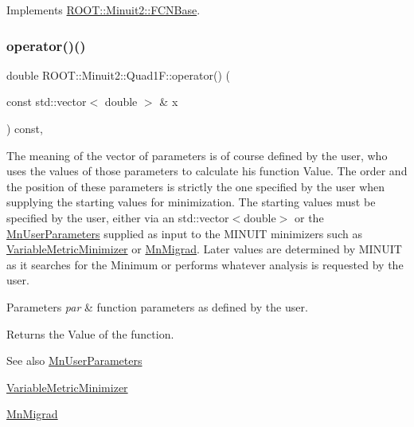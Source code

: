 Implements \mbox{\hyperlink{classROOT_1_1Minuit2_1_1FCNBase_ae4a86bd94d0d0f5ca6fc8f8ab2bb43cd}{R\+O\+O\+T\+::\+Minuit2\+::\+F\+C\+N\+Base}}.

\mbox{\label{classROOT_1_1Minuit2_1_1Quad1F_a879588547439114ea9ad1e749f1300c5}} 
\subsubsection{\texorpdfstring{operator()()}{operator()()}\hspace{0.1cm}{\footnotesize\ttfamily [2/2]}}
{\footnotesize\ttfamily double R\+O\+O\+T\+::\+Minuit2\+::\+Quad1\+F\+::operator() (\begin{DoxyParamCaption}\item[{const std\+::vector$<$ double $>$ \&}]{x }\end{DoxyParamCaption}) const\hspace{0.3cm}{\ttfamily [inline]}, {\ttfamily [virtual]}}

The meaning of the vector of parameters is of course defined by the user, who uses the values of those parameters to calculate his function Value. The order and the position of these parameters is strictly the one specified by the user when supplying the starting values for minimization. The starting values must be specified by the user, either via an std\+::vector$<$double$>$ or the \mbox{\hyperlink{classROOT_1_1Minuit2_1_1MnUserParameters}{Mn\+User\+Parameters}} supplied as input to the M\+I\+N\+U\+IT minimizers such as \mbox{\hyperlink{classROOT_1_1Minuit2_1_1VariableMetricMinimizer}{Variable\+Metric\+Minimizer}} or \mbox{\hyperlink{classROOT_1_1Minuit2_1_1MnMigrad}{Mn\+Migrad}}. Later values are determined by M\+I\+N\+U\+IT as it searches for the Minimum or performs whatever analysis is requested by the user.


\begin{DoxyParams}{Parameters}
{\em par} & function parameters as defined by the user.\\
\hline
\end{DoxyParams}
\begin{DoxyReturn}{Returns}
the Value of the function.
\end{DoxyReturn}
\begin{DoxySeeAlso}{See also}
\mbox{\hyperlink{classROOT_1_1Minuit2_1_1MnUserParameters}{Mn\+User\+Parameters}} 

\mbox{\hyperlink{classROOT_1_1Minuit2_1_1VariableMetricMinimizer}{Variable\+Metric\+Minimizer}} 

\mbox{\hyperlink{classROOT_1_1Minuit2_1_1MnMigrad}{Mn\+Migrad}} 
\end{DoxySeeAlso}


